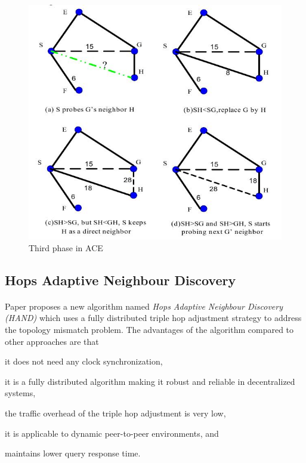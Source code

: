 \documentclass[a4paper,10pt]{article}
\begin{document}
\begin{figure}
\centering
  \includegraphics[scale=0.4]{img/ace_phase3.jpeg}
\caption{Third phase in ACE}
\label{figure:ace_phase3}
\end{figure}

\subsection{Hops Adaptive Neighbour Discovery}

\paragraph{}
Paper \cite{chen_hand_2006} proposes a new algorithm named \emph{Hops Adaptive Neighbour Discovery (HAND)} which uses a fully distributed triple hop adjustment strategy to address the topology mismatch problem. The advantages of the algorithm compared to other approaches are that
\begin{inparaenum}
  \item it does not need any clock synchronization,
  \item it is a fully distributed algorithm making it robust and reliable in decentralized systems,
  \item the traffic overhead of the triple hop adjustment is very low,
  \item it is applicable to dynamic peer-to-peer environments, and
  \item maintains lower query response time.
\end{inparaenum}
\end{document}

